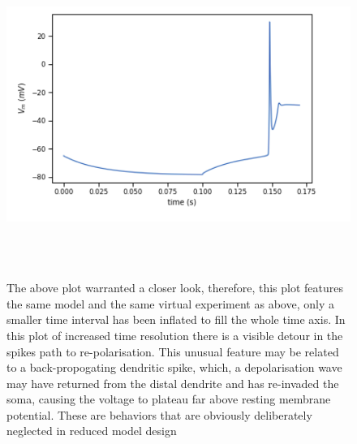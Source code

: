 \begin{figure}
 \begin{center}
    \includegraphics[scale=0.8]{figures/spike_shape.png}
    \caption[Complex spike in the L5PC model]{The above plot warranted a closer look, therefore, this plot features the same model and the same virtual experiment as above, only a smaller time interval has been inflated to fill the whole time axis. In this plot of increased time resolution there is a visible detour in the spikes path to re-polarisation. This unusual feature may be related to a back-propogating dendritic spike, which, a depolarisation wave may have returned from the distal dendrite and has re-invaded the soma, causing the voltage to plateau far above resting membrane potential. These are behaviors that are obviously deliberately neglected in reduced model design}
  \label{fig:sub1}
  \end{center}
\end{figure}

